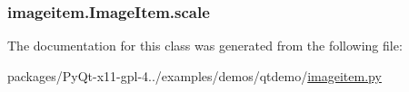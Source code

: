 \subsubsection[{scale}]{\setlength{\rightskip}{0pt plus 5cm}imageitem.\+Image\+Item.\+scale}\label{classimageitem_1_1ImageItem_a6b1b2f0e0af2323821f4eec7fdcc7c1d}


The documentation for this class was generated from the following file\+:\begin{DoxyCompactItemize}
\item 
packages/\+Py\+Qt-\/x11-\/gpl-\/4../examples/demos/qtdemo/\hyperlink{imageitem_8py}{imageitem.\+py}\end{DoxyCompactItemize}
